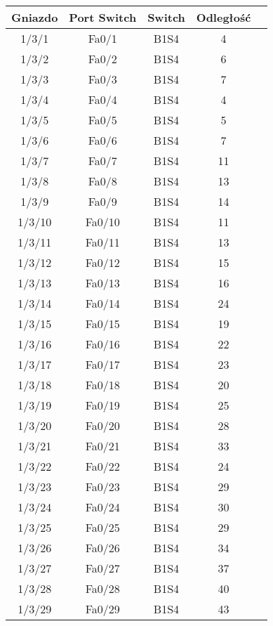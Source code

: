 \begin{center}
\begin{longtable}{|c|c|c|c|c|}
    \end{longtable}
\end{center}

\begin{center}
    \begin{longtable}{|c|c|c|c|c|}
    \hline
    Gniazdo & Port Switch & Switch & Odległość \\ \hline
	1/3/1 & Fa0/1 & B1S4 & 4 \\ \hline
	1/3/2 & Fa0/2 & B1S4 & 6 \\ \hline
	1/3/3 & Fa0/3 & B1S4 & 7 \\ \hline
	1/3/4 & Fa0/4 & B1S4 & 4 \\ \hline
	1/3/5 & Fa0/5 & B1S4 & 5 \\ \hline
	1/3/6 & Fa0/6 & B1S4 & 7 \\ \hline
	1/3/7 & Fa0/7 & B1S4 & 11 \\ \hline
	1/3/8 & Fa0/8 & B1S4 & 13 \\ \hline
	1/3/9 & Fa0/9 & B1S4 & 14 \\ \hline
	1/3/10 & Fa0/10 & B1S4 & 11 \\ \hline
	1/3/11 & Fa0/11 & B1S4 & 13 \\ \hline
	1/3/12 & Fa0/12 & B1S4 & 15 \\ \hline
	1/3/13 & Fa0/13 & B1S4 & 16 \\ \hline
	1/3/14 & Fa0/14 & B1S4 & 24 \\ \hline
	1/3/15 & Fa0/15 & B1S4 & 19 \\ \hline
	1/3/16 & Fa0/16 & B1S4 & 22 \\ \hline
	1/3/17 & Fa0/17 & B1S4 & 23 \\ \hline
	1/3/18 & Fa0/18 & B1S4 & 20 \\ \hline
	1/3/19 & Fa0/19 & B1S4 & 25 \\ \hline
	1/3/20 & Fa0/20 & B1S4 & 28 \\ \hline
	1/3/21 & Fa0/21 & B1S4 & 33 \\ \hline
	1/3/22 & Fa0/22 & B1S4 & 24 \\ \hline
	1/3/23 & Fa0/23 & B1S4 & 29 \\ \hline
	1/3/24 & Fa0/24 & B1S4 & 30 \\ \hline
	1/3/25 & Fa0/25 & B1S4 & 29 \\ \hline
	1/3/26 & Fa0/26 & B1S4 & 34 \\ \hline
	1/3/27 & Fa0/27 & B1S4 & 37 \\ \hline
	1/3/28 & Fa0/28 & B1S4 & 40 \\ \hline
	1/3/29 & Fa0/29 & B1S4 & 43 \\ \hline

\end{longtable}
\end{center}
